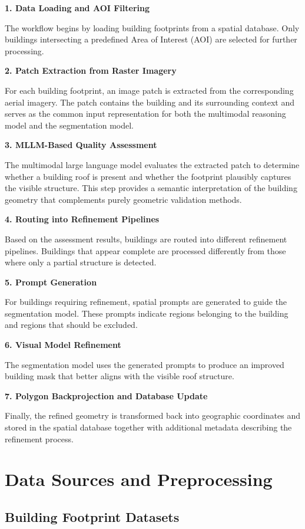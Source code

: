 \textbf{1. Data Loading and AOI Filtering}

The workflow begins by loading building footprints from a spatial database. Only buildings intersecting a predefined Area of Interest (AOI) are selected for further processing. 

\textbf{2. Patch Extraction from Raster Imagery}

For each building footprint, an image patch is extracted from the corresponding aerial imagery. The patch contains the building and its surrounding context and serves as the common input representation for both the multimodal reasoning model and the segmentation model.

\textbf{3. MLLM-Based Quality Assessment}

The multimodal large language model evaluates the extracted patch to determine whether a building roof is present and whether the footprint plausibly captures the visible structure. This step provides a semantic interpretation of the building geometry that complements purely geometric validation methods.

\textbf{4. Routing into Refinement Pipelines}

Based on the assessment results, buildings are routed into different refinement pipelines. Buildings that appear complete are processed differently from those where only a partial structure is detected.

\textbf{5. Prompt Generation}

For buildings requiring refinement, spatial prompts are generated to guide the segmentation model. These prompts indicate regions belonging to the building and regions that should be excluded.

\textbf{6. Visual Model Refinement}

The segmentation model uses the generated prompts to produce an improved building mask that better aligns with the visible roof structure.

\textbf{7. Polygon Backprojection and Database Update}

Finally, the refined geometry is transformed back into geographic coordinates and stored in the spatial database together with additional metadata describing the refinement process.


\section{Data Sources and Preprocessing}

\subsection{Building Footprint Datasets}

